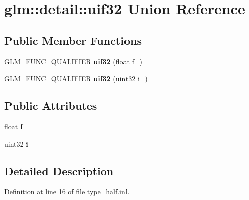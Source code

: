 \hypertarget{unionglm_1_1detail_1_1uif32}{}\section{glm\+:\+:detail\+:\+:uif32 Union Reference}
\label{unionglm_1_1detail_1_1uif32}
\subsection*{Public Member Functions}
\begin{DoxyCompactItemize}
\item 
\mbox{\label{unionglm_1_1detail_1_1uif32_a0d6e08c93b3d52c01e45864ff689c426}} 
G\+L\+M\+\_\+\+F\+U\+N\+C\+\_\+\+Q\+U\+A\+L\+I\+F\+I\+ER {\bfseries uif32} (float f\+\_\+)
\item 
\mbox{\label{unionglm_1_1detail_1_1uif32_aee424b46f48baa812572c015ec8bf434}} 
G\+L\+M\+\_\+\+F\+U\+N\+C\+\_\+\+Q\+U\+A\+L\+I\+F\+I\+ER {\bfseries uif32} (uint32 i\+\_\+)
\end{DoxyCompactItemize}
\subsection*{Public Attributes}
\begin{DoxyCompactItemize}
\item 
\mbox{\label{unionglm_1_1detail_1_1uif32_a5f697f84c5a8ec72c2f3a4f705f5bde8}} 
float {\bfseries f}
\item 
\mbox{\label{unionglm_1_1detail_1_1uif32_a981c1c59e160db23c73908cd7e629229}} 
uint32 {\bfseries i}
\end{DoxyCompactItemize}


\subsection{Detailed Description}


Definition at line 16 of file type\+\_\+half.\+inl.



